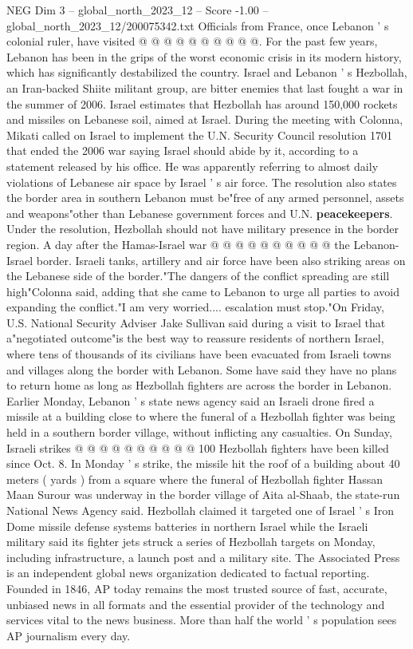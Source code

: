 \begin{textsample}{NEG Dim 3 – global\_north\_2023\_12 – Score -1.00 – global\_north\_2023\_12/200075342.txt}
Officials from France, once Lebanon ' s colonial ruler, have visited @ @ @ @ @ @ @ @ @ @.
For the past few years, Lebanon has been in the grips of the worst economic crisis in its modern history, which has significantly destabilized the country.
Israel and Lebanon ' s Hezbollah, an Iran-backed Shiite militant group, are bitter enemies that last fought a war in the summer of 2006.
Israel estimates that Hezbollah has around 150,000 rockets and missiles on Lebanese soil, aimed at Israel.
During the meeting with Colonna, Mikati called on Israel to implement the U.N.
Security Council resolution 1701 that ended the 2006 war saying Israel should abide by it, according to a statement released by his office.
He was apparently referring to almost daily violations of Lebanese air space by Israel ' s air force.
The resolution also states the border area in southern Lebanon must be"free of any armed personnel, assets and weapons"other than Lebanese government forces and U.N. \textbf{peacekeepers}.
Under the resolution, Hezbollah should not have military presence in the border region.
A day after the Hamas-Israel war @ @ @ @ @ @ @ @ @ @ the Lebanon-Israel border.
Israeli tanks, artillery and air force have been also striking areas on the Lebanese side of the border."The dangers of the conflict spreading are still high"Colonna said, adding that she came to Lebanon to urge all parties to avoid expanding the conflict."I am very worried.... escalation must stop."On Friday, U.S.
National Security Adviser Jake Sullivan said during a visit to Israel that a"negotiated outcome"is the best way to reassure residents of northern Israel, where tens of thousands of its civilians have been evacuated from Israeli towns and villages along the border with Lebanon.
Some have said they have no plans to return home as long as Hezbollah fighters are across the border in Lebanon.
Earlier Monday, Lebanon ' s state news agency said an Israeli drone fired a missile at a building close to where the funeral of a Hezbollah fighter was being held in a southern border village, without inflicting any casualties.
On Sunday, Israeli strikes @ @ @ @ @ @ @ @ @ @ 100 Hezbollah fighters have been killed since Oct. 8.
In Monday ' s strike, the missile hit the roof of a building about 40 meters ( yards ) from a square where the funeral of Hezbollah fighter Hassan Maan Surour was underway in the border village of Aita al-Shaab, the state-run National News Agency said.
Hezbollah claimed it targeted one of Israel ' s Iron Dome missile defense systems batteries in northern Israel while the Israeli military said its fighter jets struck a series of Hezbollah targets on Monday, including infrastructure, a launch post and a military site.
The Associated Press is an independent global news organization dedicated to factual reporting.
Founded in 1846, AP today remains the most trusted source of fast, accurate, unbiased news in all formats and the essential provider of the technology and services vital to the news business.
More than half the world ' s population sees AP journalism every day.

\end{textsample}
